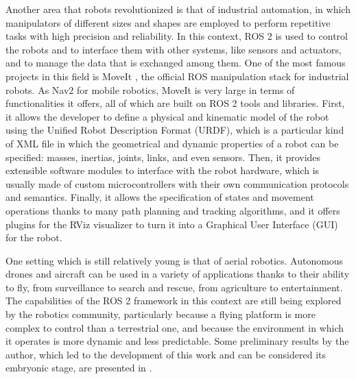 Another area that robots revolutionized is that of industrial automation, in which manipulators of different sizes and shapes are employed to perform repetitive tasks with high precision and reliability. In this context, ROS 2 is used to control the robots and to interface them with other systems, like sensors and actuators, and to manage the data that is exchanged among them. One of the most famous projects in this field is MoveIt \cite{picknik_robotics_moveit_nodate,gorner_moveit_2019,coleman_reducing_2014,bonci_robot_2023}, the official ROS manipulation stack for industrial robots. As Nav2 for mobile robotics, MoveIt is very large in terms of functionalities it offers, all of which are built on ROS 2 tools and libraries. First, it allows the developer to define a physical and kinematic model of the robot using the Unified Robot Description Format (URDF), which is a particular kind of XML file in which the geometrical and dynamic properties of a robot can be specified: masses, inertias, joints, links, and even sensors. Then, it provides extensible software modules to interface with the robot hardware, which is usually made of custom microcontrollers with their own communication protocols and semantics. Finally, it allows the specification of states and movement operations thanks to many path planning and tracking algorithms, and it offers plugins for the RViz visualizer to turn it into a Graphical User Interface (GUI) for the robot.

One setting which is still relatively young is that of aerial robotics. Autonomous drones and aircraft can be used in a variety of applications thanks to their ability to fly, from surveillance to search and rescue, from agriculture to entertainment. The capabilities of the ROS 2 framework in this context are still being explored by the robotics community, particularly because a flying platform is more complex to control than a terrestrial one, and because the environment in which it operates is more dynamic and less predictable. Some preliminary results by the author, which led to the development of this work and can be considered its embryonic stage, are presented in \cite{bianchi_novel_2023,bianchi_efficient_2023}.

